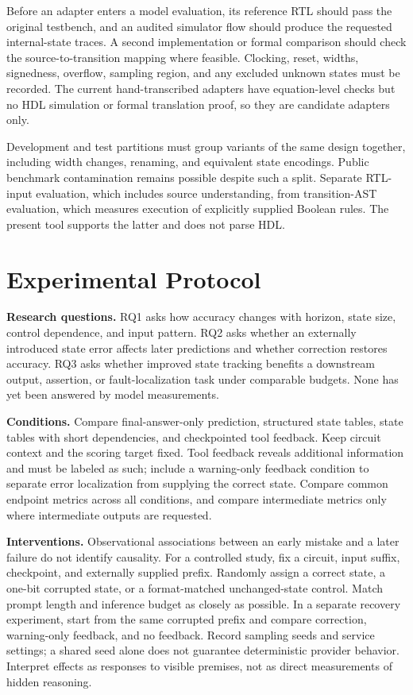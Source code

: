 \documentclass[conference,10pt]{IEEEtran}
\begin{document}
Before an adapter enters a model evaluation, its reference RTL should pass the original testbench, and an audited simulator flow should produce the requested internal-state traces. A second implementation or formal comparison should check the source-to-transition mapping where feasible. Clocking, reset, widths, signedness, overflow, sampling region, and any excluded unknown states must be recorded. The current hand-transcribed adapters have equation-level checks but no HDL simulation or formal translation proof, so they are candidate adapters only.

Development and test partitions must group variants of the same design together, including width changes, renaming, and equivalent state encodings. Public benchmark contamination remains possible despite such a split. Separate RTL-input evaluation, which includes source understanding, from transition-AST evaluation, which measures execution of explicitly supplied Boolean rules. The present tool supports the latter and does not parse HDL.

\section{Experimental Protocol}
\textbf{Research questions.} RQ1 asks how accuracy changes with horizon, state size, control dependence, and input pattern. RQ2 asks whether an externally introduced state error affects later predictions and whether correction restores accuracy. RQ3 asks whether improved state tracking benefits a downstream output, assertion, or fault-localization task under comparable budgets. None has yet been answered by model measurements.

\textbf{Conditions.} Compare final-answer-only prediction, structured state tables, state tables with short dependencies, and checkpointed tool feedback. Keep circuit context and the scoring target fixed. Tool feedback reveals additional information and must be labeled as such; include a warning-only feedback condition to separate error localization from supplying the correct state. Compare common endpoint metrics across all conditions, and compare intermediate metrics only where intermediate outputs are requested.

\textbf{Interventions.} Observational associations between an early mistake and a later failure do not identify causality. For a controlled study, fix a circuit, input suffix, checkpoint, and externally supplied prefix. Randomly assign a correct state, a one-bit corrupted state, or a format-matched unchanged-state control. Match prompt length and inference budget as closely as possible. In a separate recovery experiment, start from the same corrupted prefix and compare correction, warning-only feedback, and no feedback. Record sampling seeds and service settings; a shared seed alone does not guarantee deterministic provider behavior. Interpret effects as responses to visible premises, not as direct measurements of hidden reasoning.
\end{document}
